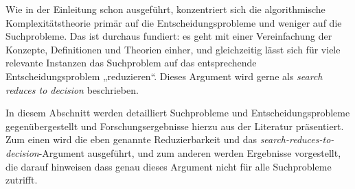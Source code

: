 Wie in der Einleitung schon ausgeführt, konzentriert sich die algorithmische Komplexitätstheorie primär auf die Entscheidungsprobleme und weniger auf die Suchprobleme. Das ist durchaus fundiert: es geht mit einer Vereinfachung der Konzepte, Definitionen und Theorien einher, und gleichzeitig lässt sich für viele relevante Instanzen das Suchproblem auf das entsprechende Entscheidungsproblem „reduzieren“. Dieses Argument wird gerne als \emph{search reduces to decision} beschrieben.

In diesem Abschnitt werden detailliert Suchprobleme und Entscheidungsprobleme gegenübergestellt und Forschungsergebnisse hierzu aus der Literatur präsentiert.
Zum einen wird die eben genannte Reduzierbarkeit und das \emph{search-reduces-to-decision}-Argument ausgeführt, und zum anderen werden Ergebnisse vorgestellt, die darauf hinweisen dass genau dieses Argument nicht für alle Suchprobleme zutrifft.

